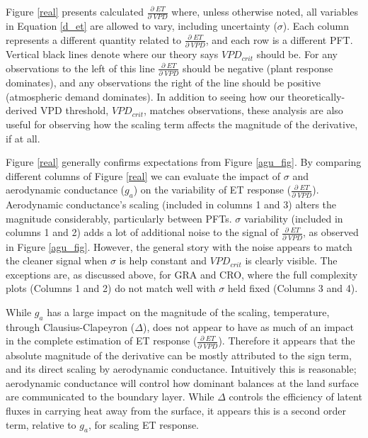 \documentclass[draft,linenumbers]{agujournal}
\begin{document}
Figure \ref{real} presents calculated $\frac{\partial \; ET}{\partial \; VPD}$ where, unless otherwise noted, all variables in Equation \ref{d_et} are allowed to vary, including uncertainty ($\sigma$). Each column represents a different quantity related to $\frac{\partial \; ET}{\partial \; VPD}$, and each row is a different PFT. Vertical black lines denote where our theory says $VPD_{crit}$ should be. For any observations to the left of this line $\frac{\partial \; ET}{\partial \; VPD}$ should be negative (plant response dominates), and any observations the right of the line should be positive (atmospheric demand dominates). In addition to seeing how our theoretically-derived VPD threshold, $VPD_{crit}$, matches observations, these analysis are also useful for observing how the scaling term affects the magnitude of the derivative, if at all. 

Figure \ref{real} generally confirms expectations from Figure \ref{agu_fig}. By comparing different columns of Figure \ref{real} we can evaluate the impact of $\sigma$ and aerodynamic conductance ($g_a$) on the variability of ET response ($\frac{\partial \; ET}{\partial \; VPD}$). Aerodynamic conductance's scaling (included in columns 1 and 3) alters the magnitude considerably, particularly between PFTs. $\sigma$ variability (included in columns 1 and 2) adds a lot of additional noise to the signal of $\frac{\partial \; ET}{\partial \; VPD}$, as observed in Figure \ref{agu_fig}. However, the general story with the noise appears to match the cleaner signal when $\sigma$ is help constant and $VPD_{crit}$ is clearly visible. The exceptions are, as discussed above, for GRA and CRO, where the full complexity plots (Columns 1 and 2) do not match well with $\sigma$ held fixed (Columns 3 and 4).

While $g_a$ has a large impact on the magnitude of the scaling, temperature, through Clausius-Clapeyron ($\Delta$), does not appear to have as much of an impact in the complete estimation of ET response ($\frac{\partial \; ET}{\partial \; VPD}$). Therefore it appears that the absolute magnitude of the derivative can be mostly attributed to the sign term, and its direct scaling by aerodynamic conductance. Intuitively this is reasonable; aerodynamic conductance will control how dominant balances at the land surface are communicated to the boundary layer. While $\Delta$ controls the efficiency of latent fluxes in carrying heat away from the surface, it appears this is a second order term, relative to $g_a$, for scaling ET response. 
\end{document}
